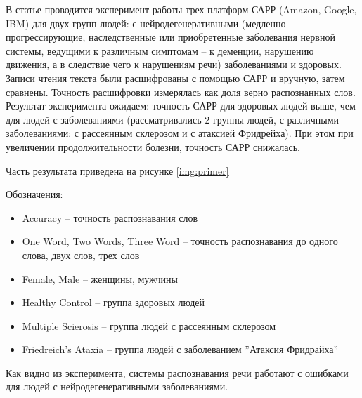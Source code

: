 В статье \cite{primer} проводится эксперимент работы трех платформ САРР (Amazon, Google, IBM) для двух групп людей: с нейродегенеративными (медленно прогрессирующие, наследственные или приобретенные заболевания нервной системы, ведущими к различным симптомам -- к деменции, нарушению движения, а в следствие чего к нарушениям речи) заболеваниями и здоровых. Записи чтения текста были расшифрованы с помощью САРР и вручную, затем сравнены. Точность расшифровки измерялась как доля верно распознанных слов. Результат эксперимента ожидаем: точность САРР для здоровых людей выше, чем для людей с заболеваниями (рассматривались 2 группы людей, с различными заболеваниями: с рассеянным склерозом и с атаксией Фридрейха). При этом при увеличении продолжительности болезни, точность САРР снижалась. 

Часть результата приведена на рисунке \ref{img:primer}

Обозначения: 
\begin{itemize}
	\item Accuracy -- точность распознавания слов
	\item One Word, Two Words, Three Word -- точность распознавания до одного слова, двух слов, трех слов
	\item Female, Male -- женщины, мужчины
	\item Healthy Control -- группа здоровых людей
	\item Multiple Scierosis -- группа людей с рассеянным склерозом
	\item Friedreich's Ataxia -- группа людей с заболеванием ''Атаксия Фридрайха''
\end{itemize}

Как видно из эксперимента, системы распознавания речи работают с ошибками для людей с нейродегенеративными заболеваниями.